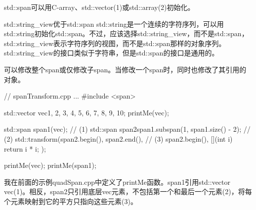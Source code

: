 std::span可以用C-array、std::vector(1)或std::array(2)初始化。



\begin{myTip}{std::string\_view优于std::span}
std::string是一个连续的字符序列，可以用std::string初始化std::span。不过，应该选择std::string\_view，而不是std::span，std::string\_view表示字符序列的视图，而不是std::span那样的对象序列。std::string\_view的接口类似于字符串，但是std::span的接口是通用的。
\end{myTip}

可以修改整个span或仅修改子span。当修改一个span时，同时也修改了其引用的对象。


\begin{cpp}
// spanTransform.cpp
...
#include <span>

std::vector vec{1, 2, 3, 4, 5, 6, 7, 8, 9, 10};
printMe(vec);

std::span span1(vec); // (1)
std::span span2{span1.subspan(1, span1.size() - 2)}; // (2)
std::transform(span2.begin(), span2.end(), // (3)
				span2.begin(),
				[](int i){ return i * i; });
				
printMe(vec);
printMe(span1);
\end{cpp}

我在前面的示例quadSpan.cpp中定义了printMe函数。span1引用std::vector vec(1)。相反，span2只引用底层vec元素，不包括第一个和最后一个元素(2)，将每个元素映射到它的平方只指向这些元素(3)。



